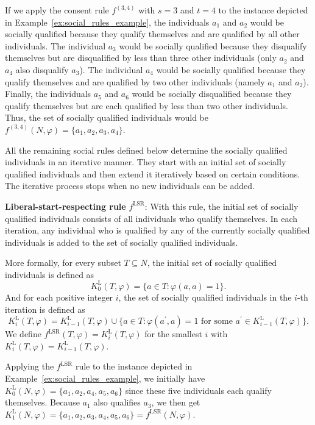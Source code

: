 \documentclass[
    12pt,               %
    a4paper,            %
    bibtotoc,           %
    pointlessnumbers,   %
    ngerman,            %
    titlepage,          %
    leqno,              %
    ]{scrarticle}       %
\newcommand\exref{Example~\ref}
\begin{document}
If we apply the consent rule $f^{(3, 4)}$ with $s=3$ and $t=4$ to the instance depicted in \exref{ex:social_rules_example}, the individuals $a_1$ and $a_2$ would be socially qualified because they qualify themselves and are qualified by all other individuals. The individual $a_3$ would be socially qualified because they disqualify themselves but are disqualified by less than three other individuals (only $a_2$ and $a_4$ also disqualify $a_3$). The individual $a_4$ would be socially qualified because they qualify themselves and are qualified by two other individuals (namely $a_1$ and $a_2$). Finally, the individuals $a_5$ and $a_6$ would be socially disqualified because they qualify themselves but are each qualified by less than two other individuals. Thus, the set of socially qualified individuals would be $f^{(3, 4)}(N, \varphi) = \{ a_1, a_2, a_3, a_4 \}$.



All the remaining social rules defined below determine the socially qualified individuals in an iterative manner. They start with an initial set of socially qualified individuals and then extend it iteratively based on certain conditions. The iterative process stops when no new individuals can be added.



\textbf{Liberal-start-respecting rule} $f^{\text{LSR}}$: With this rule, the initial set of socially qualified individuals consists of all individuals who qualify themselves. In each iteration, any individual who is qualified by any of the currently socially qualified individuals is added to the set of socially qualified individuals.

More formally, for every subset $T \subseteq N$, the initial set of socially qualified individuals is defined as
$$
K^{\text{L}}_0(T, \varphi) = \{ a \in T : \varphi(a, a) = 1 \}.
$$
And for each positive integer $i$, the set of socially qualified individuals in the $i$-th iteration is defined as
$$
K^{\text{L}}_i(T, \varphi) = K^{\text{L}}_{i-1}(T, \varphi) \cup \{ a \in T : \varphi(a^\prime, a) = 1 \text{ for some } a^\prime \in K^{\text{L}}_{i-1}(T, \varphi) \}.
$$
We define $f^{\text{LSR}}(T, \varphi) = K^{\text{L}}_i(T, \varphi)$ for the smallest $i$ with $K^{\text{L}}_i(T, \varphi) = K^{\text{L}}_{i-1}(T, \varphi)$.

Applying the $f^{\text{LSR}}$ rule to the instance depicted in \exref{ex:social_rules_example}, we initially have $K^{\text{L}}_0(N, \varphi) = \{ a_1, a_2, a_4, a_5, a_6 \}$ since these five individuals each qualify themselves. Because $a_1$ also qualifies $a_3$, we then get $K^{\text{L}}_1(N, \varphi) = \{ a_1, a_2, a_3, a_4, a_5, a_6 \} = f^{\text{LSR}}(N, \varphi)$.
\end{document}

